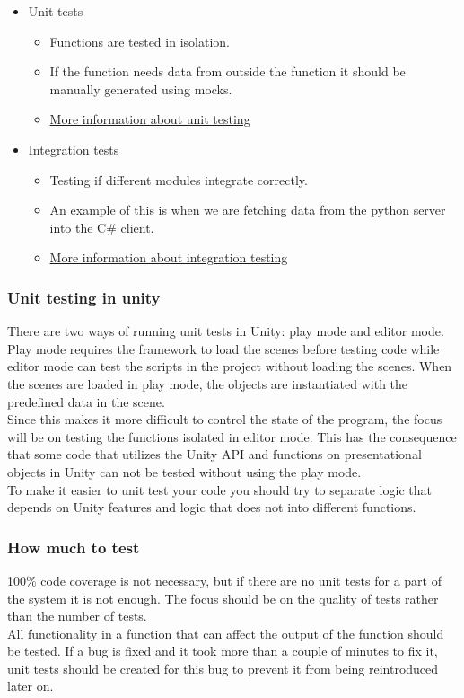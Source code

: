 \begin{itemize}
    \item Unit tests
        \begin{itemize}
            \item Functions are tested in isolation.
            \item If the function needs data from outside the function it should be manually generated using mocks.
            \item \href{http://softwaretestingfundamentals.com/unit-testing/}{More information about unit testing}
        \end{itemize}
    \item Integration tests
        \begin{itemize}
            \item Testing if different modules integrate correctly.
            \item An example of this is when we are fetching data from the python server into the C\# client.
            \item \href{http://softwaretestingfundamentals.com/integration-testing/}{More information about integration testing}
        \end{itemize}
\end{itemize}

\subsubsection{Unit testing in unity}
There are two ways of running unit tests in Unity: play mode and editor mode. 
Play mode requires the framework to load the scenes before testing code while editor mode can test the scripts in the project without loading the scenes. 
When the scenes are loaded in play mode, the objects are instantiated with the predefined data in the scene.
\\ 
Since this makes it more difficult to control the state of the program, the focus will be on testing the functions isolated in editor mode. 
This has the consequence that some code that utilizes the Unity API and functions on presentational objects in Unity can not be tested without using the play mode.
\\
To make it easier to unit test your code you should try to separate logic that depends on Unity features and logic that does not into different functions.


\subsubsection{How much to test}
100\% code coverage is not necessary, but if there are no unit tests for a part of the system it is not enough. 
The focus should be on the quality of tests rather than the number of tests.
\\
All functionality in a function that can affect the output of the function should be tested.
If a bug is fixed and it took more than a couple of minutes to fix it, unit tests should be created for this bug to prevent it from being reintroduced later on.
